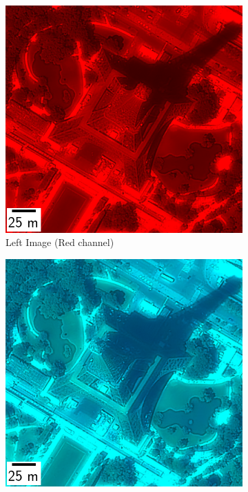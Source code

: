 \begin{figure}
    \begin{subfigure}[t]{0.32\linewidth}
        \flushleft
        \includegraphics[width=\linewidth]{Images/0_Intro/eiffel_tower_left.png}
        \caption{Left Image (Red channel)}
        \label{fig:eiffel_tower_left}
    \end{subfigure}\hfill
    \begin{subfigure}[t]{0.32\linewidth}
        \centering
        \includegraphics[width=\linewidth]{Images/0_Intro/eiffel_tower_right.png}

\end{subfigure}
\end{figure}
